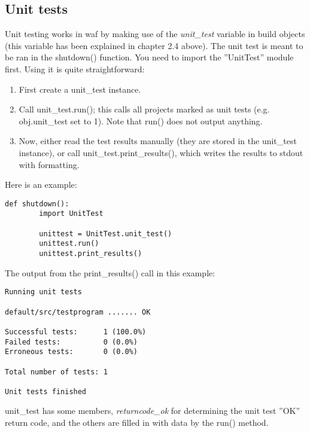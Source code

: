 \documentclass[a4paper,10pt]{article}
\begin{document}
\subsection{Unit tests}
Unit testing works in waf by making use of the \emph{unit\_test} variable in build objects (this variable has been explained in chapter 2.4 above).
The unit test is meant to be ran in the shutdown() function. You need to import the ''UnitTest'' module first. Using it is quite straightforward:\\

\begin{enumerate}
	\item First create a unit\_test instance.
	\item Call unit\_test.run(); this calls all projects marked as unit tests (e.g. obj.unit\_test set to 1). Note that run() does not output anything.
	\item Now, either read the test results manually (they are stored in the unit\_test instance), or call unit\_test.print\_results(), which writes the results to stdout with formatting.
\end{enumerate}

Here is an example:

\begin{center}
	\begin{lstlisting}
def shutdown():
        import UnitTest

        unittest = UnitTest.unit_test()
        unittest.run()
        unittest.print_results()
	\end{lstlisting}
\end{center}

The output from the print\_results() call in this example:

\begin{center}
	\begin{verbatim}
Running unit tests

default/src/testprogram ....... OK

Successful tests:      1 (100.0%)
Failed tests:          0 (0.0%)
Erroneous tests:       0 (0.0%)

Total number of tests: 1

Unit tests finished
	\end{verbatim}
\end{center}

unit\_test has some members, \emph{returncode\_ok} for determining the unit test ''OK'' return code, and the others are filled in with data by the run() method.
\end{document}
